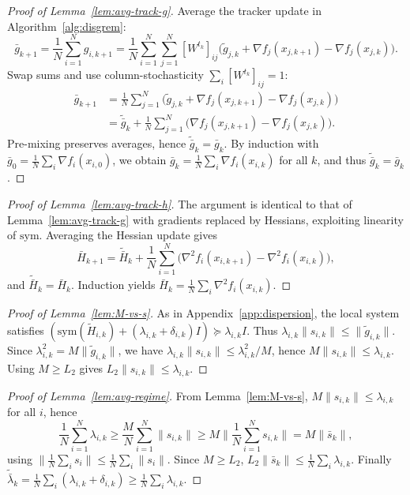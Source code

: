 \documentclass[11pt,a4paper]{article}
\begin{document}
\begin{proof}[Proof of Lemma~\ref{lem:avg-track-g}]
Average the tracker update in Algorithm~\ref{alg:disgrem}:
\[
\bar g_{k+1}
=\frac1N\sum_{i=1}^N g_{i,k+1}
=\frac1N\sum_{i=1}^N\sum_{j=1}^N [W^{t_k}]_{ij}\Big(\tilde g_{j,k}+\nabla f_j(x_{j,k+1})-\nabla f_j(x_{j,k})\Big).
\]
Swap sums and use column-stochasticity $\sum_i [W^{t_k}]_{ij}=1$:
\begin{align*}
\bar g_{k+1}&=\tfrac1N\textstyle\sum_{j=1}^N\!\Big(\tilde g_{j,k}+\nabla f_j(x_{j,k+1})-\nabla f_j(x_{j,k})\Big)\\
&=\tilde{\bar g}_k+\tfrac1N\textstyle\sum_{j=1}^N\!\big(\nabla f_j(x_{j,k+1})-\nabla f_j(x_{j,k})\big).
\end{align*}
Pre-mixing preserves averages, hence $\tilde{\bar g}_k=\bar g_k$.
By induction with $\bar g_0=\frac1N\sum_i \nabla f_i(x_{i,0})$, we obtain
$\bar g_k=\frac1N\sum_i \nabla f_i(x_{i,k})$ for all $k$, and thus $\tilde{\bar g}_k=\bar g_k$.
\end{proof}

\begin{proof}[Proof of Lemma~\ref{lem:avg-track-h}]
The argument is identical to that of Lemma~\ref{lem:avg-track-g} with gradients replaced by Hessians, exploiting linearity of $\mathrm{sym}$.
Averaging the Hessian update gives
\[
\bar H_{k+1}=\tilde{\bar H}_k+\frac1N\sum_{i=1}^N\big(\nabla^2 f_i(x_{i,k+1})-\nabla^2 f_i(x_{i,k})\big),
\]
and $\tilde{\bar H}_k=\bar H_k$. Induction yields $\bar H_k=\frac1N\sum_i \nabla^2 f_i(x_{i,k})$.
\end{proof}

\begin{proof}[Proof of Lemma~\ref{lem:M-vs-s}]
As in Appendix~\ref{app:dispersion}, the local system satisfies
$(\mathrm{sym}(\tilde H_{i,k})+(\lambda_{i,k}+\delta_{i,k})I)\succeq \lambda_{i,k}I$.
Thus $\lambda_{i,k}\|s_{i,k}\|\le \|\tilde g_{i,k}\|$.
Since $\lambda_{i,k}^2=M\|\tilde g_{i,k}\|$, we have $\lambda_{i,k}\|s_{i,k}\|\le \lambda_{i,k}^2/M$,
hence $M\|s_{i,k}\|\le \lambda_{i,k}$. Using $M\ge L_2$ gives $L_2\|s_{i,k}\|\le\lambda_{i,k}$.
\end{proof}

\begin{proof}[Proof of Lemma~\ref{lem:avg-regime}]
From Lemma~\ref{lem:M-vs-s}, $M\|s_{i,k}\|\le \lambda_{i,k}$ for all $i$, hence
\[
\frac1N\sum_{i=1}^N\lambda_{i,k}\ge \frac{M}{N}\sum_{i=1}^N\|s_{i,k}\|\ge M\Big\|\frac1N\sum_{i=1}^N s_{i,k}\Big\|=M\|\bar s_k\|,
\]
using $\|\frac1N\sum_i s_i\|\le \frac1N\sum_i\|s_i\|$.
Since $M\ge L_2$, $L_2\|\bar s_k\|\le \frac1N\sum_i\lambda_{i,k}$.
Finally $\tilde{\bar\lambda}_k=\frac1N\sum_i(\lambda_{i,k}+\delta_{i,k})\ge \frac1N\sum_i\lambda_{i,k}$.
\end{proof}
\end{document}
